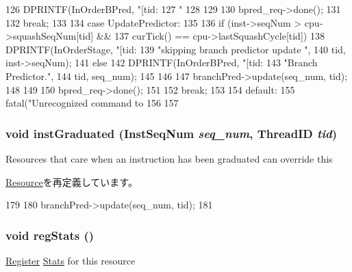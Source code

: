 \begin{DoxyCode}
{{{{126                 DPRINTF(InOrderBPred, "[tid:%
127                         "%
128             }
129 
130             bpred_req->done();
131         }
132         break;
133 
134       case UpdatePredictor:
135         {
136             if (inst->seqNum > cpu->squashSeqNum[tid] &&
137                 curTick() == cpu->lastSquashCycle[tid]) {
138                 DPRINTF(InOrderStage, "[tid:%
139                         "skipping branch predictor update \n",
140                         tid, inst->seqNum);
141             } else {
142                 DPRINTF(InOrderBPred, "[tid:%
143                         "Branch Predictor.\n",
144                         tid, seq_num);
145 
146 
147                 branchPred->update(seq_num, tid);
148             }
149 
150             bpred_req->done();
151         }
152         break;
153 
154       default:
155         fatal("Unrecognized command to %
156     }
157 }
\end{DoxyCode}
\hypertarget{classBranchPredictor_a3f5f4da90448a4c3a3c0533881fb3129}{
\subsubsection[{instGraduated}]{\setlength{\rightskip}{0pt plus 5cm}void instGraduated ({\bf InstSeqNum} {\em seq\_\-num}, \/  {\bf ThreadID} {\em tid})}}
\label{classBranchPredictor_a3f5f4da90448a4c3a3c0533881fb3129}
Resources that care when an instruction has been graduated can override this 

\hyperlink{classResource_ad09300971c77caba13bf59e77b99ea24}{Resource}を再定義しています。


\begin{DoxyCode}
179 {
180     branchPred->update(seq_num, tid);
181 }
\end{DoxyCode}
\hypertarget{classBranchPredictor_a4dc637449366fcdfc4e764cdf12d9b11}{
\subsubsection[{regStats}]{\setlength{\rightskip}{0pt plus 5cm}void regStats ()}}
\label{classBranchPredictor_a4dc637449366fcdfc4e764cdf12d9b11}
\hyperlink{classRegister}{Register} \hyperlink{namespaceStats}{Stats} for this resource 

